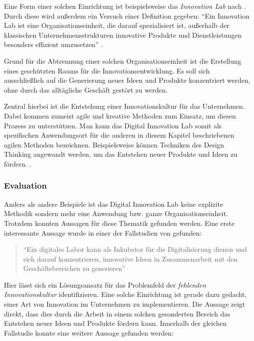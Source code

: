 Eine Form einer solchen Einrichtung ist beispielsweise das \textit{Innovation Lab} nach . Durch diese wird außerdem ein Versuch einer Definition gegeben: ``Ein Innovation Lab ist eine Organisationseinheit, die darauf spezialisiert ist, außerhalb der klassischen Unternehmensstrukturen innovative Produkte und Dienstleistungen besonders effizient umzusetzen'' \cite{meyer_innovation_nodate}.

Grund für die Abtrennung einer solchen Organisationseinheit ist die Erstellung eines geschützten Raums für die Innovationsentwicklung. Es soll sich ausschließlich auf die Generierung neuer Ideen und Produkte konzentriert werden, ohne durch das alltägliche Geschäft gestört zu werden.

Zentral hierbei ist die Entstehung einer Innovationskultur für das Unternehmen. Dabei kommen zumeist agile und kreative Methoden zum Einsatz, um diesen Prozess zu unterstützen. Man kann das Digital Innovation Lab somit als spezifischen Anwendungsort für die anderen in diesem Kapitel beschriebenen agilen Methoden bezeichnen. Beispielsweise  können Techniken des Design Thinking angewandt werden, um das Entstehen neuer Produkte und Ideen zu fördern. \cite{meyer_innovation_nodate}.


\subsubsection{Evaluation}

Anders als andere Beispiele ist das Digital Innovation Lab keine explizite Methodik sondern mehr eine Anwendung bzw. ganze Organisationseinheit. Trotzdem konnten Aussagen für diese Thematik gefunden werden. Eine erste interessante Aussage wurde in einer der Fallstudien von  gefunden:

\begin{quote}
	``Ein digitales Labor kann als Inkubator für die Digitalisierung dienen und sich darauf konzentrieren, innovative Ideen in Zusammenarbeit mit den Geschäftsbereichen zu generieren'' \cite[S. 266]{urbach_digitalization_2018}
\end{quote}

Hier lässt sich ein Lösungsansatz für das Problemfeld der \textit{fehlenden Innovationskultur} identifizieren. Eine solche Einrichtung ist gerade dazu gedacht, einer Art von Innovation im Unternehmen zu  implementieren. Die Aussage zeigt direkt, dass dies durch die Arbeit in einem solchen gesonderten Bereich das Entstehen neuer Ideen und Produkte fördern kann. Innerhalb der gleichen Fallstudie konnte eine weitere Aussage gefunden werden:

